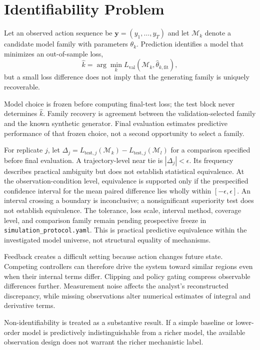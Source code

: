 \section{Identifiability Problem}

Let an observed action sequence be $\mathbf y=(y_1,\ldots,y_T)$ and let $\mathcal M_k$ denote a candidate model family with parameters $\theta_k$. Prediction identifies a model that minimizes an out-of-sample loss,
\[
\hat{k}=\arg\min_k L_{\mathrm{val}}(\mathcal M_k,\hat\theta_{k,\mathrm{fit}}),
\]
but a small loss difference does not imply that the generating family is uniquely recoverable.

Model choice is frozen before computing final-test loss; the test block never determines $\hat{k}$. Family recovery is agreement between the validation-selected family and the known synthetic generator. Final evaluation estimates predictive performance of that frozen choice, not a second opportunity to select a family.

For replicate $j$, let $\Delta_j=L_{\mathrm{test},j}(\mathcal M_k)-L_{\mathrm{test},j}(\mathcal M_l)$ for a comparison specified before final evaluation. A trajectory-level near tie is $|\Delta_j|<\epsilon$. Its frequency describes practical ambiguity but does not establish statistical equivalence. At the observation-condition level, equivalence is supported only if the prespecified confidence interval for the mean paired difference lies wholly within $[-\epsilon,\epsilon]$. An interval crossing a boundary is inconclusive; a nonsignificant superiority test does not establish equivalence. The tolerance, loss scale, interval method, coverage level, and comparison family remain pending prospective freeze in \texttt{simulation\_protocol.yaml}. This is practical predictive equivalence within the investigated model universe, not structural equality of mechanisms.

Feedback creates a difficult setting because action changes future state. Competing controllers can therefore drive the system toward similar regions even when their internal terms differ. Clipping and policy gating compress observable differences further. Measurement noise affects the analyst's reconstructed discrepancy, while missing observations alter numerical estimates of integral and derivative terms.

Non-identifiability is treated as a substantive result. If a simple baseline or lower-order model is predictively indistinguishable from a richer model, the available observation design does not warrant the richer mechanistic label.

